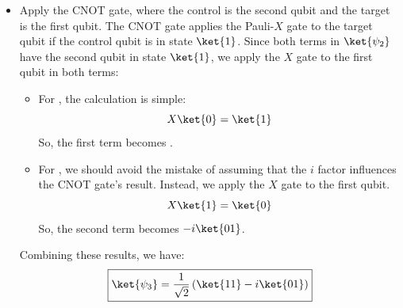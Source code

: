 \begin{itemize}
\begin{itemize}
            \item For , the first qubit is in state $\ket{1}$, so we apply the $S$ gate to the second qubit. The second qubit is in state $\ket{1}$, so we have:
                \begin{equation*}
                    S\ket{1} = i\ket{1}
                \end{equation*}
        \end{itemize}
        Combining these results, we have:
        \begin{equation*}
            \boxed{\ket{\psi_{2}} = \frac{1}{\sqrt{2}} \left(\ket{01} - i\ket{11}\right)}
        \end{equation*}

    \item Apply the CNOT gate, where the control is the second qubit and the target is the first qubit. The CNOT gate applies the Pauli-$X$ gate to the target qubit if the control qubit is in state $\ket{1}$. Since both terms in $\ket{\psi_{2}}$ have the second qubit in state $\ket{1}$, we apply the $X$ gate to the first qubit in both terms:
        \begin{itemize}
            \item For , the calculation is simple:
                \begin{equation*}
                    X\ket{0} = \ket{1}
                \end{equation*}
                So, the first term becomes .

            \item For , we should avoid the mistake of assuming that the $i$ factor influences the CNOT gate's result. Instead, we apply the $X$ gate to the first qubit.
                \begin{equation*}
                    X\ket{1} = \ket{0}
                \end{equation*}
                So, the second term becomes $-i\ket{01}$.
        \end{itemize}
        Combining these results, we have:
        \begin{equation*}
            \boxed{\ket{\psi_{3}} = \frac{1}{\sqrt{2}} \left(\ket{11} - i\ket{01}\right)}
        \end{equation*}


\end{itemize}
